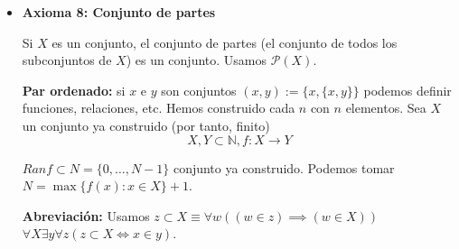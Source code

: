 \begin{itemize}
		 
		 \item \textbf{Axioma 8: Conjunto de partes}

		 Si $X$ es un conjunto, el conjunto de partes (el conjunto de todos los subconjuntos de $X$) es un conjunto. Usamos $\mathcal{P}(X)$.
		 
		 \textbf{Par ordenado:} si $x$ e $y$ son conjuntos $(x,y):=\{x, \{x,y\} \}$ podemos definir funciones, relaciones, etc. Hemos construido cada $n$ con $n$ elementos. Sea $X$ un conjunto ya construido (por tanto, finito)
		 $$X,Y \subset \mathbb{N}, f:X\to Y$$
		 
		 $Ran f \subset N = \{0, \hdots, N-1\}$ conjunto ya construido. Podemos tomar $N = \max \{f(x): x \in X\} + 1$.
		 
		 \textbf{Abreviación: } Usamos $z\subset X \equiv \forall w((w\in z)\implies (w\in X))$
		 $\forall X \exists y \forall z(z\subset X\iff x\in y)$.
	\end{itemize}

